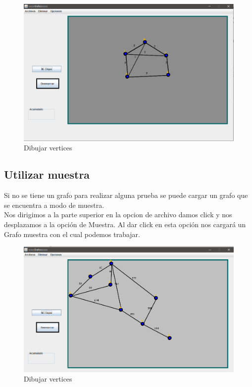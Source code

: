 \begin{figure}[h!]
\centering
\includegraphics[scale=.5]{img/union.PNG}
\caption{Dibujar vertices}
\label{Comandos}
\end{figure}

\subsection{Utilizar muestra}
Si no se tiene un grafo para realizar alguna prueba se puede cargar un grafo que se encuentra a modo de muestra. 
\\
Nos dirigimos a la parte superior en la opcion de archivo damos click y nos desplazamos a la opción de Muestra. Al dar click en esta opción nos cargará un Grafo muestra con el cual podemos trabajar. 
\\
\begin{figure}[h!]
\centering
\includegraphics[scale=.45]{img/muestra.PNG}
\caption{Dibujar vertices}
\label{Comandos}
\end{figure}
\\
